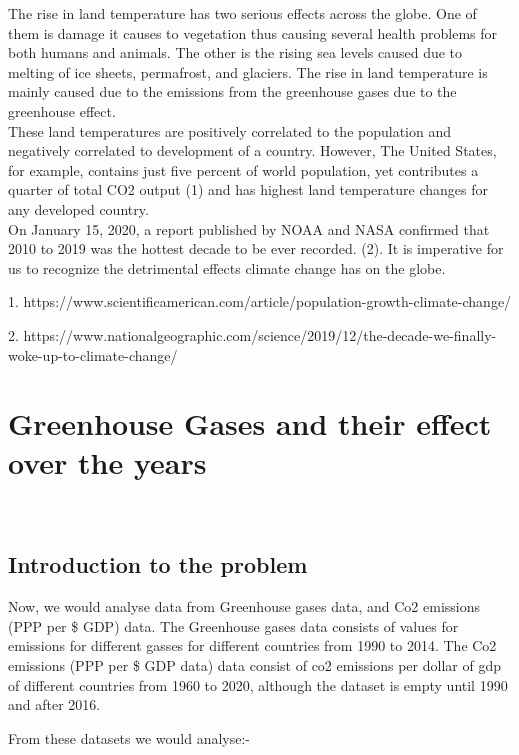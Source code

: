 \documentclass[a4paper, 11pt]{report}
\begin{document}
	The rise in land temperature has two serious effects across the globe. One of them is damage it causes to vegetation thus causing several health problems for both humans and animals. The other is the rising sea levels caused due to melting of ice sheets, permafrost, and glaciers. The rise in land temperature is mainly caused due to the emissions from the greenhouse gases due to the greenhouse effect. \\

These land temperatures are positively correlated to the population and negatively correlated to development of a country. However, The United States, for example, contains just five percent of world population, yet contributes a quarter of total CO2 output (1) and has highest land temperature changes for any developed country. \\

	On January 15, 2020, a report published by NOAA and NASA confirmed that 2010 to 2019 was the hottest decade to be ever recorded. (2). It is imperative for us to recognize the detrimental effects climate change has on the globe.\\
	\scriptsize

	1. https://www.scientificamerican.com/article/population-growth-climate-change/

	2. https://www.nationalgeographic.com/science/2019/12/the-decade-we-finally-woke-up-to-climate-change/

	\normalsize



\newpage
\section{Greenhouse Gases and their effect over the years}
~\\

\subsection{Introduction to the problem}
Now, we would analyse data from Greenhouse gases data, and Co2 emissions (PPP per \$ GDP) data. The Greenhouse gases data consists of values for emissions for different gasses for different countries from 1990 to 2014. The Co2 emissions (PPP per \$ GDP data) data consist of co2 emissions per dollar of gdp of different countries from 1960 to 2020, although the dataset is empty until 1990 and after 2016.

From these datasets we would analyse:-
\end{document}
